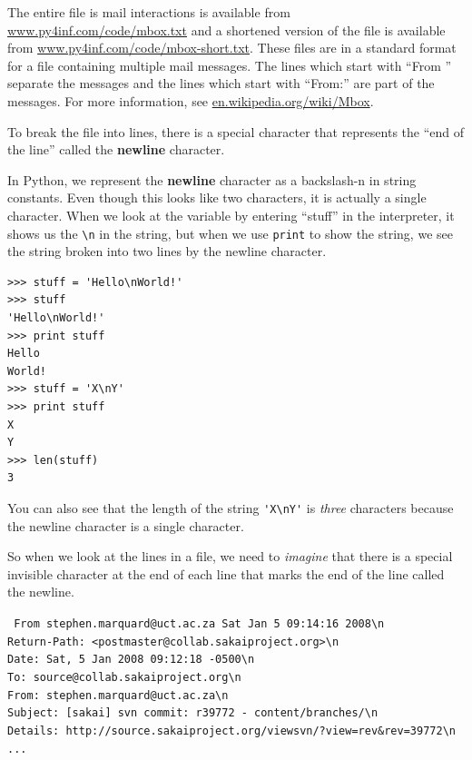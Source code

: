 \documentclass[10pt]{book}
\begin{document}
The entire file is mail interactions is available from 
\url{www.py4inf.com/code/mbox.txt} 
and a shortened version of the file is available from
\url{www.py4inf.com/code/mbox-short.txt}.
These files are in a standard format for a file containing 
multiple mail messages. The lines which start with 
``From '' separate the messages and the lines which start 
with ``From:'' are part of the messages. 
For more information, see 
\url{en.wikipedia.org/wiki/Mbox}. 

To break the file into lines, there is a special character that 
represents the ``end of the line'' called the {\bf newline} character.

In Python, we represent the {\bf newline} character as a backslash-n in 
string constants.  Even though this looks like two characters, it
is actually a single character.  When we look at the variable by entering
``stuff'' in the interpreter, it shows us the \verb"\n" in the string, 
but when we use {\tt print} to show the string, we see the string broken
into two lines by the newline character.

\beforeverb
\begin{verbatim}
>>> stuff = 'Hello\nWorld!'
>>> stuff
'Hello\nWorld!'
>>> print stuff
Hello
World!
>>> stuff = 'X\nY'
>>> print stuff
X
Y
>>> len(stuff)
3
\end{verbatim}
\afterverb
%

You can also see that the length of the string \verb"'X\nY'" is {\em three}
characters because the newline character is a single character.

So when we look at the lines in a file, we need to {\em imagine}
that there is a special invisible character at the end of each line
that marks the end of the line called the newline.  

{\tt
From stephen.marquard@uct.ac.za Sat Jan  5 09:14:16 2008\verb"\n"\\
Return-Path: <postmaster@collab.sakaiproject.org>\verb"\n"\\
Date: Sat, 5 Jan 2008 09:12:18 -0500\verb"\n"\\
To: source@collab.sakaiproject.org\verb"\n"\\
From: stephen.marquard@uct.ac.za\verb"\n"\\
Subject: [sakai] svn commit: r39772 - content/branches/\verb"\n"\\
Details: http://source.sakaiproject.org/viewsvn/?view=rev\&rev=39772\verb"\n"\\
...
}
\end{document}

